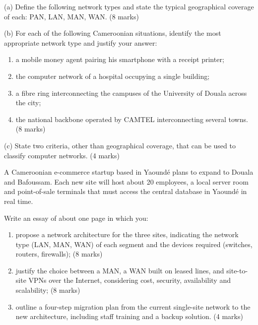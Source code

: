 \documentclass[11pt]{article}
\newcounter{popsec}
\newcounter{popsub}
\newcommand{\courssub}[1]{%
  \stepcounter{popsub}%
  \par\vspace{9pt}\noindent{\popxbold\fontsize{11.5}{13}\selectfont\color{popink}{\color{poporange}\thepopsec.\thepopsub}\hspace{6pt}#1}\par\nopagebreak\vspace{4pt}
}
\begin{document}
\courssub{I prepare for the GCE}

\begin{exercice}
(a) Define the following network types and state the typical geographical coverage of each: PAN, LAN, MAN, WAN. \hfill (8 marks)

(b) For each of the following Cameroonian situations, identify the most appropriate network type and justify your answer:
\begin{enumerate}
\item a mobile money agent pairing his smartphone with a receipt printer;
\item the computer network of a hospital occupying a single building;
\item a fibre ring interconnecting the campuses of the University of Douala across the city;
\item the national backbone operated by CAMTEL interconnecting several towns. \hfill (8 marks)
\end{enumerate}

(c) State two criteria, other than geographical coverage, that can be used to classify computer networks. \hfill (4 marks)
\end{exercice}

\begin{exercice}
A Cameroonian e-commerce startup based in Yaoundé plans to expand to Douala and Bafoussam. Each new site will host about 20 employees, a local server room and point-of-sale terminals that must access the central database in Yaoundé in real time.

Write an essay of about one page in which you:
\begin{enumerate}
\item propose a network architecture for the three sites, indicating the network type (LAN, MAN, WAN) of each segment and the devices required (switches, routers, firewalls); \hfill (8 marks)
\item justify the choice between a MAN, a WAN built on leased lines, and site-to-site VPNs over the Internet, considering cost, security, availability and scalability; \hfill (8 marks)
\item outline a four-step migration plan from the current single-site network to the new architecture, including staff training and a backup solution. \hfill (4 marks)
\end{enumerate}
\end{exercice}
\end{document}
